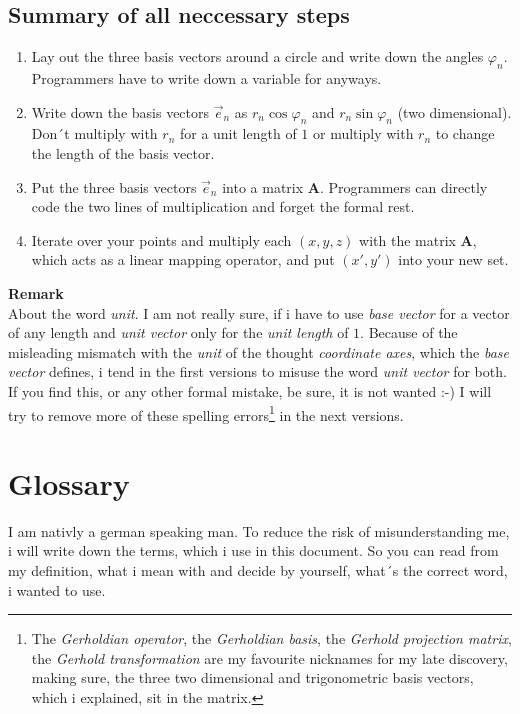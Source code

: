 \documentclass[a4paper]{article}
\begin{document}
\begin{Example}
\subsection{Summary of all neccessary steps}
\begin{enumerate}
\item Lay out the three basis vectors around a circle and write down the angles $\varphi_{n}$. Programmers have to write down a variable for anyways.
\item Write down the basis vectors $\vec{e}_{n}$ as $r_{n} \cos \varphi_{n}$ and $r_{n} \sin \varphi_{n}$ (two dimensional). Don´t multiply with $r_{n}$ for a unit length of $1$ or multiply with $r_{n}$ to change the length of the basis vector.
\item Put the three basis vectors $\vec{e}_{n}$ into a matrix $\boldsymbol{A}$. Programmers can directly code the two lines of multiplication and forget the formal rest.
\item Iterate over your points and multiply each $(x,y,z)$ with the matrix $\boldsymbol{A}$, which acts as a linear mapping operator, and put $(x',y')$ into your new set.
\end{enumerate}

\textbf{Remark}\\
About the word \emph{unit}. I am not really sure, if i have to use \emph{base vector} for a vector of any length and \emph{unit vector} only for the \emph{unit length} of $1$. Because of the misleading mismatch with the \emph{unit} of the thought \emph{coordinate axes}, which the \emph{base vector} defines, i tend in the first versions to misuse the word \emph{unit vector} for both. If you find this, or any other formal mistake, be sure, it is not wanted :-) I will try to remove more of these spelling errors\footnote{The \emph{Gerholdian operator}, the \emph{Gerholdian basis}, the \emph{Gerhold projection matrix}, the \emph{Gerhold transformation} are my favourite nicknames for my late discovery, making sure, the three two dimensional and trigonometric basis vectors, which i explained, sit in the matrix.} in the next versions.
\section{Glossary}

I am nativly a german speaking man. To reduce the risk of misunderstanding me, i will write down the terms, which i use in this document. So you can read from my definition, what i mean with and decide by yourself, what´s the correct word, i wanted to use.\\



\end{Example}
\end{document}

